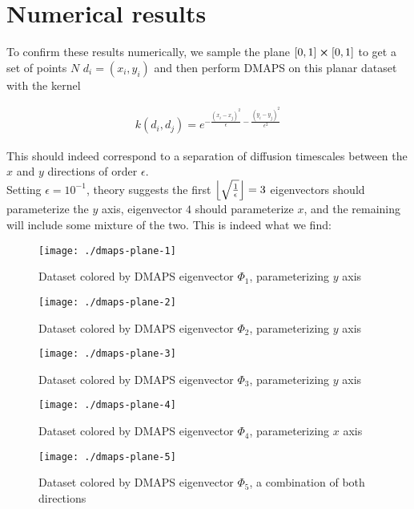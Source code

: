 \documentclass[11pt]{article}
\DeclarePairedDelimiter\floor{\lfloor}{\rfloor}
\begin{document}
\section{Numerical results}

To confirm these results numerically, we sample the plane
$[0,1] \cross [0,1]$ to get a set of points $N$ $d_i = (x_i, y_i)$ and
then perform DMAPS on this planar dataset with the kernel

\begin{align}
  k(d_i,d_j) = e^{- \frac{(x_i - x_j)^2}{\epsilon} -
  \frac{(y_i - y_j)^2}{\epsilon^2}}
\end{align}

This should indeed correspond to a separation of diffusion timescales
between the $x$ and $y$ directions of order $\epsilon$. \\

Setting $\epsilon = 10^{-1}$, theory suggests the first
$\floor*{\sqrt{\frac{1}{\epsilon}}}=3$ eigenvectors should
parameterize the $y$ axis, eigenvector $4$ should parameterize $x$,
and the remaining will include some mixture of the two. This is indeed
what we find:

\begin{figure}[htbp]
  \centering
  \texttt{[image: ./dmaps-plane-1]}
  \caption{Dataset colored by DMAPS eigenvector $\Phi_1$,
    parameterizing $y$ axis}
\end{figure}

\begin{figure}[htbp]
  \centering
  \texttt{[image: ./dmaps-plane-2]}
  \caption{Dataset colored by DMAPS eigenvector $\Phi_2$,
    parameterizing $y$ axis}
\end{figure}

\begin{figure}[htbp]
  \centering
  \texttt{[image: ./dmaps-plane-3]}
  \caption{Dataset colored by DMAPS eigenvector $\Phi_3$,
    parameterizing $y$ axis}
\end{figure}

\begin{figure}[htbp]
  \centering
  \texttt{[image: ./dmaps-plane-4]}
  \caption{Dataset colored by DMAPS eigenvector $\Phi_4$,
    parameterizing $x$ axis}
\end{figure}

\begin{figure}[htbp]
  \centering
  \texttt{[image: ./dmaps-plane-5]}
  \caption{Dataset colored by DMAPS eigenvector $\Phi_5$,
    a combination of both directions}
\end{figure}
\end{document}
